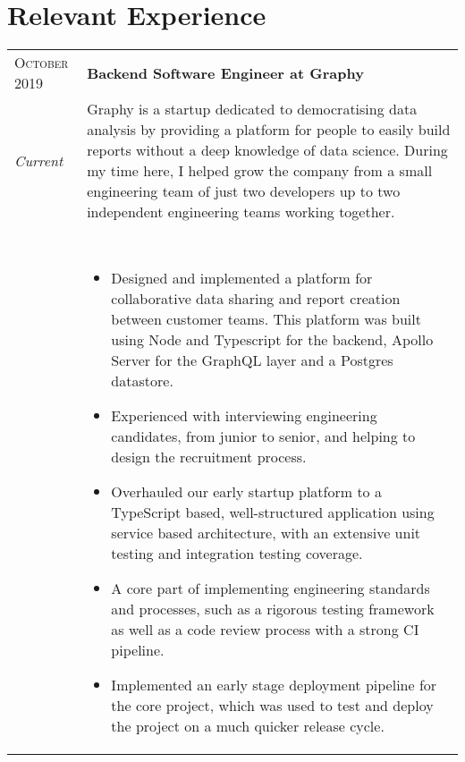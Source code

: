 

\section{Relevant Experience}\label{sec:relevant-experience}

\begin{tabular}{p{60pt}|p{11cm}}
    \hspace*{\fill}\textsc{October 2019} & \textbf{Backend Software Engineer at Graphy} \\

    \hspace*{\fill}\emph{Current}& \small{
        Graphy is a startup dedicated to democratising data analysis by providing a platform for people to easily build reports without a deep knowledge of data science.
        During my time here, I helped grow the company from a small engineering team of just two developers up to two independent engineering teams working together.
    } \\
    \ & \vspace{1pt} \\
    \hspace*{\fill}       & \vspace{-0.9em}
    \begin{itemize}[itemsep=0pt,topsep=0pt,leftmargin=*]
        \small
        \item Designed and implemented a platform for collaborative data sharing and report creation between customer teams.
        This platform was built using Node and Typescript for the backend, Apollo Server for the GraphQL layer and a Postgres datastore.
        \item Experienced with interviewing engineering candidates, from junior to senior, and helping to design the recruitment process.
        \item Overhauled our early startup platform to a TypeScript based, well-structured application using service based architecture, with an extensive unit testing and integration testing coverage.
        \item A core part of implementing engineering standards and processes, such as a rigorous testing framework as well as a code review process with a strong CI pipeline.
        \item Implemented an early stage deployment pipeline for the core project, which was used to test and deploy the project on a much quicker release cycle.
    \end{itemize}
\end{tabular} \\ \\ \\

